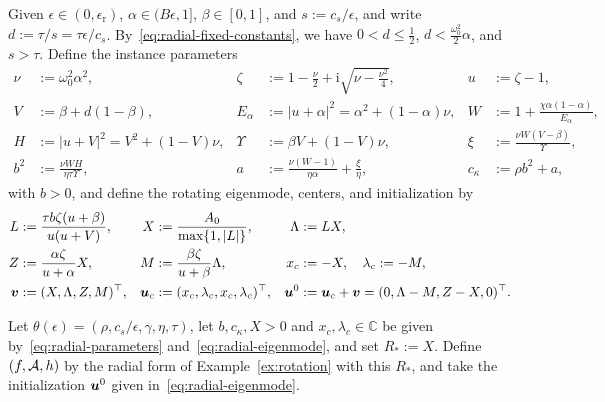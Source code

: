 Given \(\epsilon\in(0,\epsilon_\mathrm{r})\), \(\alpha\in(B\epsilon,1]\),
\(\beta\in[0,1]\), and \(s:=c_s/\epsilon\), and write \(d:=\tau/s=\tau\epsilon/c_s\).
By~\eqref{eq:radial-fixed-constants}, we have \(0<d\le\frac12\),
\(d<\frac{\omega_0^2}{2}\alpha\), and \(s>\tau\). Define the instance parameters
\begin{equation}
\begin{aligned}
\nu&:=\omega_0^2\alpha^2,
&\zeta&:=1-\frac{\nu}{2}+\mathrm{i}\sqrt{\nu-\frac{\nu^2}{4}},
&u&:=\zeta-1,\\
V&:=\beta+d(1-\beta),
&E_\alpha&:=|u+\alpha|^2=\alpha^2+(1-\alpha)\nu,
&W&:=1+\frac{\chi\alpha(1-\alpha)}{E_\alpha},\\
H&:=|u+V|^2=V^2+(1-V)\nu,
&\Upsilon&:=\beta V+(1-V)\nu,
&\xi&:=\frac{\nu W(V-\beta)}{\Upsilon},\\
b^2&:=\frac{\nu WH}{\eta\tau\Upsilon},
&a&:=\frac{\nu(W-1)}{\eta\alpha}+\frac{\xi}{\eta},
&c_\kappa&:=\rho b^2+a,
\end{aligned}
\label{eq:radial-parameters}
\end{equation}
with \(b>0\), and define the rotating eigenmode, centers, and initialization by
\begin{equation}
\begin{aligned}
L&:=\frac{\tau b\zeta(u+\beta)}{u(u+V)},
&X&:=\frac{A_0}{\max\{1,|L|\}},
&\Lambda&:=LX,\\
Z&:=\frac{\alpha\zeta}{u+\alpha}X,
&M&:=\frac{\beta\zeta}{u+\beta}\Lambda,
&x_c&:=-X,\quad\lambda_c:=-M,\\
\bm{v}&:=(X,\Lambda,Z,M)^{\top},
&\bm{u}_c&:=(x_c,\lambda_c,x_c,\lambda_c)^{\top},
&\bm{u}^0&:=\bm{u}_c+\bm{v}=(0,\Lambda-M,Z-X,0)^{\top}.
\end{aligned}
\label{eq:radial-eigenmode}
\end{equation}

\begin{example}
\label{ex:radial}
Let \(\theta(\epsilon)=(\rho,c_s/\epsilon,\gamma,\eta,\tau)\), let
\(b,c_\kappa,X>0\) and \(x_c,\lambda_c\in\mathbb C\) be given
by~\eqref{eq:radial-parameters} and~\eqref{eq:radial-eigenmode}, and set
\(R_*:=X\). Define \((f,\mathcal{A},h)\) by the radial form of
Example~\ref{ex:rotation} with this \(R_*\), and take the initialization
\(\bm{u}^0\) given in~\eqref{eq:radial-eigenmode}.
\end{example}

